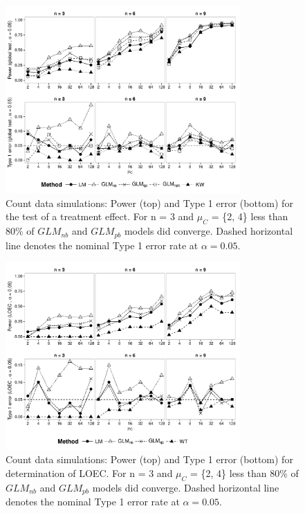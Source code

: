 \documentclass{scrartcl}
\begin{document}
\begin{figure}
  \centering
  \includegraphics[width = 0.8\textwidth]{p_glob_c.pdf}
  \caption{Count data simulations: Power (top) and Type 1 error (bottom) for the test of a treatment effect.
  For n = 3 and $\mu_C$ = \{2, 4\} less than 80\% of $GLM_{nb}$ and $GLM_{pb}$ models did converge.
  Dashed horizontal line denotes the nominal Type 1 error rate at $\alpha = 0.05$.
  }
  \label{fig:p_glob_c}
\end{figure}

\begin{figure}
  \centering
  \includegraphics[width = 0.8\textwidth]{p_loec_c.pdf}
  \caption{Count data simulations: Power (top) and Type 1 error (bottom) for determination of LOEC.
  For n = 3 and $\mu_C$ = \{2, 4\} less than 80\% of $GLM_{nb}$ and $GLM_{pb}$ models did converge.
  Dashed horizontal line denotes the nominal Type 1 error rate at $\alpha = 0.05$.
  }
  \label{fig:p_loec_c}
\end{figure}
\end{document}
